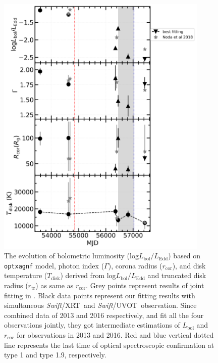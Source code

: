 \documentclass[twocolumn]{aastex63}
\newcommand{\xrt}{{\small {\it Swift}/XRT}}
\newcommand{\uvot}{{\small {\it Swift}/UVOT}}
\begin{document}
\begin{figure}
\centering
	\includegraphics[width=0.9\textwidth]{./pic/Mrk1018_disk_time_evolution.png}
    \caption{The evolution of bolometric luminosity (log$L_\mathrm{bol}/L_\mathrm{Edd}$) based on \texttt{optxagnf} model, photon index ($\Gamma$), corona radius ($r_\mathrm{cor}$), and disk temperature ($T_\mathrm{disk}$) derived from log$L_\mathrm{bol}/L_\mathrm{Edd}$ and truncated disk radius ($r_\mathrm{tr}$) as same as $r_\mathrm{cor}$. Grey points represent results of joint fitting in \citep{2018MNRAS.480.3898N}. Black data points represent our fitting results with simultaneous \xrt\, and \uvot\, observation. Since \citep{2018MNRAS.480.3898N} combined data of 2013 and 2016 respectively, and fit all the four observations jointly, they got intermediate estimations of $L_\mathrm{bol}$ and $r_{cor}$ for observations in 2013 and 2016. Red and blue vertical dotted line represents the last time of optical spectroscopic confirmation at type 1 and type 1.9, respectively.}
    \label{fig:disk_evoliton}
\end{figure}
\end{document}
